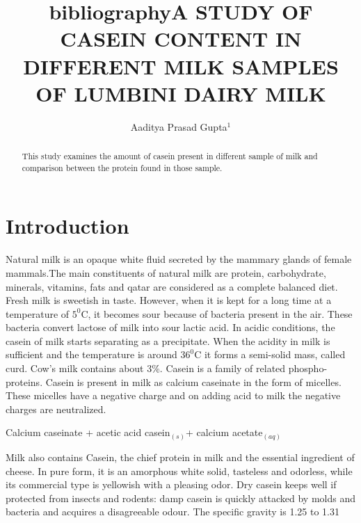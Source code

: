 \documentclass[aps, jcp, prb, two column, showpacs,groupedaddress,]{revtex4-2}
\title{bibliography}
\begin{document}
	\vspace*{0.35in}

	
    \title{A STUDY OF CASEIN CONTENT IN DIFFERENT MILK SAMPLES OF LUMBINI DAIRY MILK}
	
	
	\author{Aaditya Prasad Gupta$^{1}$}	
	

	\begin{abstract}
			 \noindent  This study examines the amount of casein present in different sample of milk and comparison between the protein found in those sample. 
\\

		
	\end{abstract}
	
	\maketitle
\tableofcontents

\section{Introduction}

Natural milk is an opaque white fluid secreted by the mammary glands of female mammals.The main constituents of natural milk are protein, carbohydrate, minerals, vitamins, fats and qatar are considered as a complete balanced diet. Fresh milk is sweetish in taste. However, when it is kept for a long time at a temperature of $5^{0}$C, it becomes sour because of bacteria present in the air. These bacteria convert lactose of milk into sour lactic acid. In acidic conditions, the casein of milk starts separating as a precipitate. When the acidity in milk is sufficient and the temperature is around $36^{0}$C it forms a semi-solid mass, called curd. Cow's milk contains about 3\%. Casein is a family of related phospho-proteins. Casein is present in milk as calcium caseinate in the form of micelles. These micelles have a negative charge and on adding acid to milk the negative charges are neutralized.

Calcium caseinate + acetic acid \rightarrow casein$_{(s)}$+ calcium acetate$_{(aq)}$

Milk also contains Casein, the chief protein in milk and the essential ingredient of cheese. In pure form, it is an amorphous white solid, tasteless and odorless, while its commercial type is yellowish with a pleasing odor. Dry casein keeps well if protected from insects and rodents: damp casein is quickly attacked by molds and bacteria and acquires a disagreeable odour. The specific gravity is 1.25 to 1.31
\end{document}
